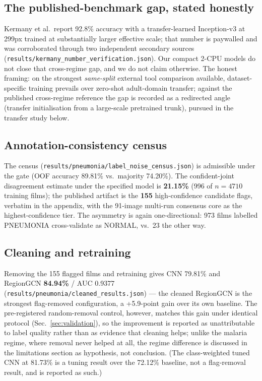 \subsection{The published-benchmark gap, stated honestly}
Kermany et al.\ report 92.8\% accuracy \cite{kermany2018} with a
transfer-learned Inception-v3 at 299px trained at substantially larger
effective scale; that number is paywalled and was corroborated through two
independent secondary sources (\texttt{results/kermany\_number\_verification.json}).
Our compact 2-CPU models do not close that cross-regime gap, and we do not
claim otherwise. The honest framing: on the strongest \emph{same-split} external tool comparison available, dataset-specific training prevails over zero-shot adult-domain transfer; against the
published cross-regime reference the gap is recorded as a redirected angle
(transfer initialisation from a large-scale pretrained trunk), pursued in
the transfer study below.
\subsection{Annotation-consistency census}
The census (\texttt{results/pneumonia/label\_noise\_census.json}) is
admissible under the gate (OOF accuracy 89.81\%
vs.\ majority 74.20\%). The confident-joint disagreement estimate under
the specified model is \textbf{21.15\%} (996 of $n=4710$ training
films); the published artifact is the \textbf{155} high-confidence
candidate flags, verbatim in the appendix, with the 91-image multi-run
consensus core as the highest-confidence tier. The asymmetry is again one-directional: 973
films labelled PNEUMONIA cross-validate as NORMAL, vs.\ 23 the other way.
\subsection{Cleaning and retraining}
Removing the 155 flagged films and retraining gives CNN
79.81\% and RegionGCN
\textbf{84.94\%} / AUC 0.9377
(\texttt{results/pneumonia/cleaned\_results.json}) --- the cleaned
RegionGCN is the strongest flag-removed configuration, a
+5.9-point gain over
its own baseline. The pre-registered random-removal control, however,
matches this gain under identical protocol
(Sec.~\ref{sec:validation}), so the improvement is reported as
unattributable to label quality rather than as evidence that cleaning
helps; unlike the malaria regime, where removal never helped at all,
the regime difference is discussed in the limitations section as
hypothesis, not conclusion. (The class-weighted tuned CNN at 81.73\%
is a tuning result over the 72.12\% baseline, not a flag-removal
result, and is reported as such.)
